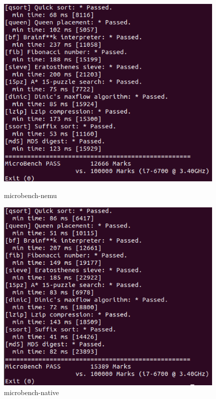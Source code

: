 \documentclass[UTF8,a4paper,10pt]{ctexart}
\begin{document}
{\begin{figure}[!h]
    \begin{minipage}[h]{0.5\linewidth}
    \centering
    \includegraphics[scale=0.25]{fig/16.png}
    \caption{microbench-nemu}
    \end{minipage}%
    \hfill
    \begin{minipage}[h]{0.5\linewidth}
    \centering
    \includegraphics[scale=0.25]{fig/17.png}
    \caption{microbench-native}
    \end{minipage}
\end{figure}
}
\end{document}
